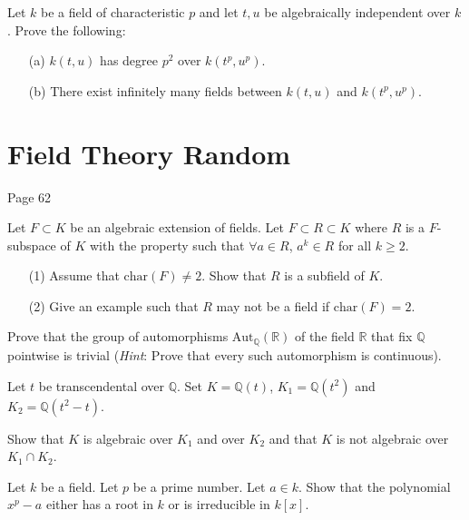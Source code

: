\begin{prob}[F2003-Q2]
    Let \(k\) be a field of characteristic \(p\) and let \(t, u\) be algebraically independent over \(k\). Prove the following:
    \begin{itemize}
        \item[(a)] \(k(t, u)\) has degree \(p^2\) over \(k(t^p, u^p)\).
        \item[(b)] There exist infinitely many fields between \(k(t, u)\) and \(k(t^p, u^p)\).
    \end{itemize}
\end{prob}




\chapter{Field Theory Random}
Page 62



\begin{prob}[S2016-Q2]
    Let \(F\subset K\) be an algebraic extension of fields. Let \(F\subset R\subset K\) where \(R\) is a \(F\)-subspace of \(K\) with the property such that \(\forall a\in R\), \(a^{k}\in R\) for all \(k\geq 2\).
    \begin{itemize}
        \item[(1)] Assume that \(\text{char}(F)\neq 2\). Show that \(R\) is a subfield of \(K\).
        \item[(2)] Give an example such that \(R\) may not be a field if \(\text{char}(F)=2\).
    \end{itemize}
\end{prob}

\begin{prob}[S2013-Q4]
    Prove that the group of automorphisms \(\text{Aut}_\mathbb{Q}(\mathbb{R})\) of the field \(\mathbb{R}\) that fix \(\mathbb{Q}\) pointwise is trivial (\textit{Hint}: Prove that every such automorphism is continuous).
\end{prob}

\begin{prob}[F2018-Q5]
    Let \(t\) be transcendental over \(\mathbb{Q}\). Set \(K=\mathbb{Q}(t)\), \(K_{1}=\mathbb{Q}(t^{2})\) and \(K_{2}=\mathbb{Q}(t^{2}-t)\).
    
    Show that \(K\) is algebraic over \(K_{1}\) and over \(K_{2}\) and that \(K\) is not algebraic over \(K_{1}\cap K_{2}\).
\end{prob}

\begin{prob}[S2006-Q4]
    Let \(k\) be a field. Let \(p\) be a prime number. Let \(a \in k\). Show that the polynomial \(x^p - a\) either has a root in \(k\) or is irreducible in \(k[x]\).
\end{prob}







